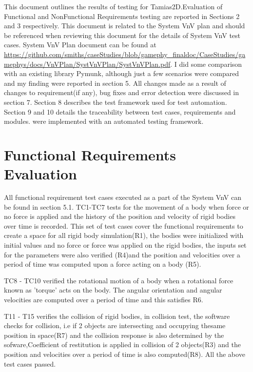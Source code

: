 \documentclass[12pt, titlepage]{article}
\newcommand{\progname}{Tamias2D}
\begin{document}
\tableofcontents

\listoftables %

\listoffigures %

\newpage


This document outlines the results of testing for \progname{}.Evaluation of Functional and NonFunctional Requirements testing are reported in Sections 2 and 3 respectively. This document is related to the System VnV plan and should be referenced when reviewing this document for the details of System VnV test cases. System VnV Plan document can be found at \url{https://github.com/smiths/caseStudies/blob/gamephy_finaldoc/CaseStudies/gamephys/docs/VnVPlan/SystVnVPlan/SystVnVPlan.pdf}. I did some comparison with an existing library Pymunk, although just a few scenarios were compared and my finding were reported in section 5. All changes made as a result of changes to requirement(if any), bug fixes and error detection were discussed in section 7. Section 8 describes the test framework used for test automation. Section 9 and 10 details the traceability between test cases, requirements and modules.
were implemented with an automated testing framework. 

\section{Functional Requirements Evaluation}
All functional requirement test cases executed as a part of the System VnV can be found in section 5.1. TC1-TC7 tests for the movement of a body when force or no force is applied and the history of the position and velocity of rigid bodies over time is recorded. This set of test cases cover the functional requirements to create a space for all rigid body simulation(R1), the bodies were initialized with initial values and no force or force was applied on the rigid bodies, the inputs set for the parameters were also verified (R4)and the position and velocities over a period of time was computed upon a force acting on a body (R5).

TC8 - TC10 verified the rotational motion of a body when a rotational force known as 'torque' acts on the body. The angular orientation and angular velocities are computed over a period of time and this satisfies R6. 

T11 - T15 verifies the collision of rigid bodies, in collision test, the software checks for collision, i.e if 2 objects are intersecting and occupying thesame position in space(R7) and the collision response is also determined by the sofware,Coefficient of restitution is applied in collision of 2 objects(R3) and the position and velocities over a period of time is also computed(R8).
All the above test cases passed.
\end{document}
